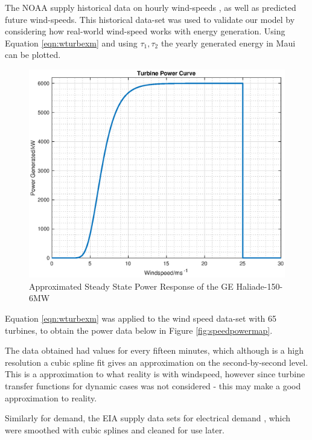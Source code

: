 The NOAA supply historical data on hourly wind-speeds \cite{power:NOAA}, as well as predicted future wind-speeds.
This historical data-set was used to validate our model by considering how real-world wind-speed works with energy generation.
Using Equation \ref{eqn:wturbexm} and using $\tau_1, \tau_2$ the yearly generated energy in Maui can be plotted.
           \begin{figure}[bht]
                   \centering
                   \includegraphics[scale=0.4]{./images/turbine.eps}
                   \caption{Approximated Steady State Power Response of the GE Haliade-150-6MW} \label{fig:wturb}
           \end{figure}

Equation \ref{eqn:wturbexm} was applied to the wind speed data-set with 65 turbines, to obtain the power data below in Figure \ref{fig:speedpowermap}.

The data obtained had values for every fifteen minutes, which although is a high resolution a cubic spline fit gives an approximation on the second-by-second level.
This is a approximation to what reality is with windspeed, however since turbine transfer functions for dynamic cases was not considered - this may make a good approximation to reality.

Similarly for demand, the EIA supply data sets for electrical demand \cite{power:EIA}, which were smoothed with cubic splines and cleaned for use later.

